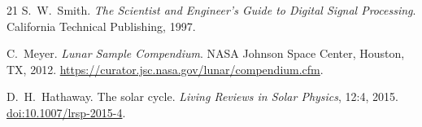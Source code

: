 \documentclass[journal,lettersize]{IEEEtran}
\providecommand{\doi}[1]{\href{https://doi.org/#1}{doi:#1}}
\begin{document}
\begin{thebibliography}{21}
S.~W.~Smith.
\newblock \emph{The Scientist and Engineer's Guide to Digital Signal
  Processing}.
\newblock California Technical Publishing, 1997.

C.~Meyer.
\newblock \emph{Lunar Sample Compendium}.
\newblock NASA Johnson Space Center, Houston, TX, 2012.
\newblock \url{https://curator.jsc.nasa.gov/lunar/compendium.cfm}.

D.~H.~Hathaway.
\newblock The solar cycle.
\newblock \emph{Living Reviews in Solar Physics}, 12:4, 2015.
\newblock \doi{10.1007/lrsp-2015-4}.

\end{thebibliography}
\end{document}
